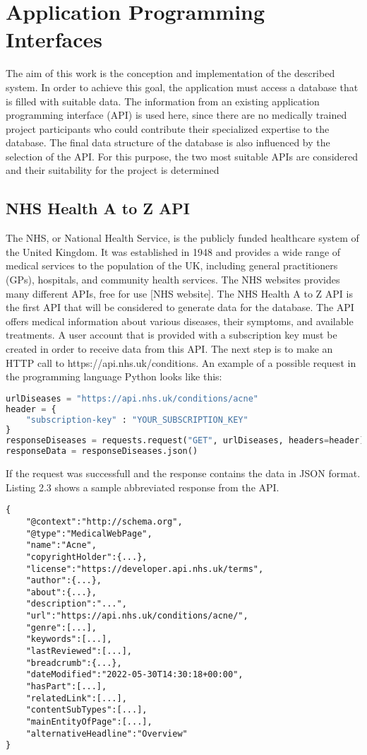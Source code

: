 \section{Application Programming Interfaces}
The aim of this work is the conception and implementation of the described system. In order to achieve this goal, the application must access a database that is filled with suitable data. The information from an existing application programming interface (API) is used here, since there are no medically trained project participants who could contribute their specialized expertise to the database. The final data structure of the database is also influenced by the selection of the API. For this purpose, the two most suitable APIs are considered and their suitability for the project is determined
\subsection{NHS Health A to Z API}
The NHS, or National Health Service, is the publicly funded healthcare system of the United Kingdom. It was established in 1948 and provides a wide range of medical services to the population of the UK, including general practitioners (GPs), hospitals, and community health services. The NHS websites provides many different APIs, free for use [NHS website]. The NHS Health A to Z API is the first API that will be considered to generate data for the database.
The API offers medical information about various diseases, their symptoms, and available treatments. A user account that is provided with a subscription key must be created in order to receive data from this API. The next step is to make an HTTP call to https://api.nhs.uk/conditions. An example of a possible request in the programming language Python looks like this:
\begin{lstlisting}[language=Python, caption={Example Python Request for the Health A to Z API}]
urlDiseases = "https://api.nhs.uk/conditions/acne"
header = {
	"subscription-key" : "YOUR_SUBSCRIPTION_KEY"
}
responseDiseases = requests.request("GET", urlDiseases, headers=header)
responseData = responseDiseases.json()
\end{lstlisting}
If the request was successfull and the response contains the data in JSON format. Listing 2.3 shows a sample abbreviated response from the API.
\begin{lstlisting}[caption={Example Response for the Health A to Z API}]
{
	"@context":"http://schema.org",
	"@type":"MedicalWebPage",
	"name":"Acne",
	"copyrightHolder":{...},
	"license":"https://developer.api.nhs.uk/terms",
	"author":{...},
	"about":{...},
	"description":"...",
	"url":"https://api.nhs.uk/conditions/acne/",
	"genre":[...],
	"keywords":[...],
	"lastReviewed":[...],
	"breadcrumb":{...},
	"dateModified":"2022-05-30T14:30:18+00:00",
	"hasPart":[...],
	"relatedLink":[...],
	"contentSubTypes":[...],
	"mainEntityOfPage":[...],
	"alternativeHeadline":"Overview"
}
\end{lstlisting}
